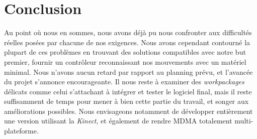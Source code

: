\section{Conclusion}
Au point où nous en sommes, nous avons déjà pu nous confronter aux difficultés réelles posées par chacune de nos exigences. Nous avons cependant contourné la plupart de ces problèmes en trouvant des solutions compatibles avec notre but premier, fournir un contrôleur reconnaissant nos mouvements avec un matériel minimal. Nous n'avons aucun retard par rapport au planning prévu, et l'avancée du projet s'annonce encourageante. Il nous reste à examiner des \emph{workpackages} délicats comme celui s'attachant à intégrer et tester le logiciel final, mais il reste suffisamment de temps pour mener à bien cette partie du travail, et songer aux améliorations possibles. Nous envisageons notamment de développer entièrement une version utilisant la \emph{Kinect}, et également de rendre MDMA totalement multi-plateforme.



